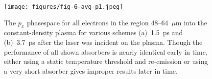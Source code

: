 \documentclass[../absorber.tex]{subfiles}
\begin{document}

\begin{figure}
\texttt{[image: figures/fig-6-avg-p1.jpeg]}
\caption{\label{fig:variation} The $p_x$ phasespace for all electrons in the region 48--64~$\mu$m into the constant-density plasma for various schemes (a)~1.5~ps and (b)~3.7~ps after the laser was incident on the plasma.  Though the performance of all shown absorbers is nearly identical early in time, either using a static temperature threshold and re-emission or using a very short absorber gives improper results later in time.}
\end{figure}

\end{document}
